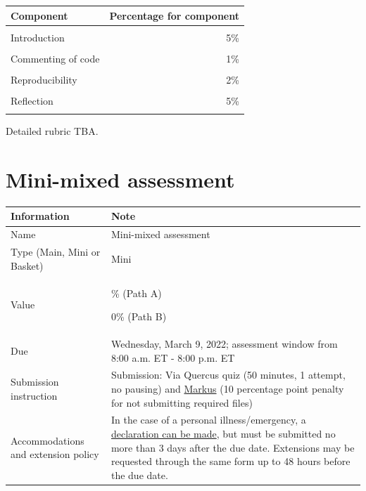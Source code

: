 \documentclass[
  openany]{book}
\newcommand{\blandscape}{\begin{landscape}}
\newcommand{\elandscape}{\end{landscape}}
\begin{document}
\begin{table}[H]
\centering\begingroup\fontsize{12}{14}\selectfont

\begin{tabular}{lr}
\toprule
Component & Percentage for component\\
\midrule
\cellcolor{gray!6}{Cover page} & \cellcolor{gray!6}{1\%}\\
Introduction & 5\%\\
\cellcolor{gray!6}{Statistical skills sample} & \cellcolor{gray!6}{60\%}\\
Commenting of code & 1\%\\
\cellcolor{gray!6}{Readability of R code} & \cellcolor{gray!6}{1\%}\\
\addlinespace
Reproducibility & 2\%\\
\cellcolor{gray!6}{Writing sample} & \cellcolor{gray!6}{20\%}\\
Reflection & 5\%\\
\cellcolor{gray!6}{General (multiple components)} & \cellcolor{gray!6}{5\%}\\
\bottomrule
\end{tabular}
\endgroup{}
\end{table}

Detailed rubric TBA.

\newpage
\blandscape

\elandscape

\hypertarget{mini-mixed-assessment}{%
\chapter{Mini-mixed assessment}\label{mini-mixed-assessment}}

\begin{longtable}[]{@{}
  >{\raggedright\arraybackslash}p{}
  >{\raggedright\arraybackslash}p{}@{}}
\toprule
\textbf{Information} & \textbf{Note} \\
\midrule
\endhead
Name & Mini-mixed assessment \\
Type (Main, Mini or Basket) & Mini \\
Value & 5\% (Path A)

0\% (Path B) \\
Due & Wednesday, March 9, 2022; assessment window from 8:00 a.m. ET - 8:00 p.m. ET \\
Submission instruction & Submission: Via Quercus quiz (50 minutes, 1 attempt, no pausing) and \href{https://markus-ds.teach.cs.toronto.edu/}{Markus} (10 percentage point penalty for not submitting required files) \\
Accommodations and extension policy & In the case of a personal illness/emergency, a \href{https://forms.office.com/Pages/ResponsePage.aspx?id=JsKqeAMvTUuQN7RtVsVSEOKHUU3SzAJJhmOKjJhDWEpUNTFDSzhZTFlXUzVYMVlNM1FEUTRZMkVWOC4u}{declaration can be made}, but must be submitted no more than 3 days after the due date. Extensions may be requested through the same form up to 48 hours before the due date. \\
\bottomrule
\end{longtable}
\end{document}
